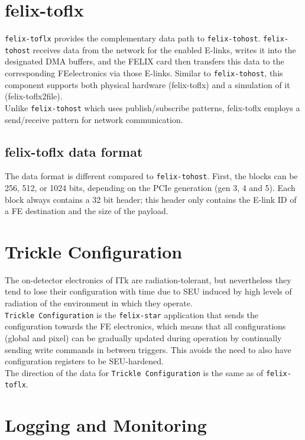 \section{felix-toflx}
\label{sec:felix_toflx}
\texttt{felix-toflx} provides the complementary data path to \texttt{felix-tohost}. \texttt{felix-tohost} receives data from the network for the enabled \acs{E-link}s, writes it into the designated \acs{DMA} buffers, and the \acs{FELIX} card then transfers this data to the corresponding \acl{FE}electronics via those \acs{E-link}s.
Similar to \texttt{felix-tohost}, this component supports both physical hardware (felix-toflx) and a simulation of it (felix-toflx2file).\\
Unlike \texttt{felix-tohost} which uses publish/subscribe patterns, felix-toflx employs a send/receive pattern for network communication.

\subsection{felix-toflx data format}

The data format is different compared to \texttt{felix-tohost}. First, the blocks can be 256, 512, or 1024 bits, depending on the \acs{PCIe} generation (gen 3, 4 and 5). Each block always contains a 32 bit header; this header only contains the \acs{E-link} ID of a \acl{FE} destination and the size of the payload.

\section{Trickle Configuration}

The on-detector electronics of \acf{ITk} are radiation-tolerant, but nevertheless they tend to lose their configuration with time due to \acl{SEU} induced by high levels of radiation \cite{buschmann2019itk} of the environment in which they operate.\\
\texttt{Trickle Configuration} is the \texttt{felix-star} application that sends the configuration towards the \acl{FE} electronics, which means that all configurations (global and pixel) can be gradually updated during operation by continually sending write commands in between triggers. This avoids the need to also have configuration registers to be \acs{SEU}-hardened.\\
The direction of the data for \texttt{Trickle Configuration} is the same as of \texttt{felix-toflx}.

\section{Logging and Monitoring}
\label{sec:felix_monitoring}

